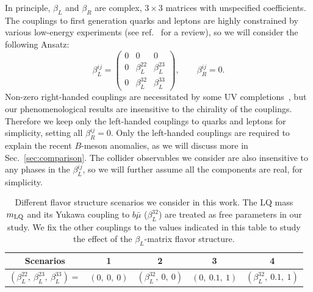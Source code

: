 \documentclass[a4paper,11pt]{article}
\begin{document}
In principle, $\beta_{L}$ and $\beta_R$ are complex, $3\times 3$ matrices with unspecified coefficients.
The couplings to first generation quarks and leptons are highly constrained by various low-energy experiments (see ref.~\cite{Dorsner:2016wpm} for a review), so we will consider the following Ansatz:
\begin{equation}
\label{eq:betas}
\beta_L^{ij} = \begin{pmatrix}
0 & 0 & 0 \\
0 & \beta_L^{22} & \beta_L^{23} \\
0 & \beta_L^{32} & \beta_L^{33}
\end{pmatrix},
\qquad
\beta_R^{ij} = 0.
\end{equation}
Non-zero right-handed couplings are necessitated by some UV completions~\cite{Pati:1973uk,Pati:1974yy}, but our phenomenological results are insensitive to the chirality of the couplings.
Therefore we keep only the left-handed couplings to quarks and leptons for simplicity, setting all $\beta_R^{ij} = 0$.
Only the left-handed couplings are required to explain the recent $B$-meson anomalies, as we will discuss more in Sec.~\ref{sec:comparison}.
The collider observables we consider are also insensitive to any phases in the $\beta_L^{ij}$, so we will further assume all the components are real, for simplicity.






\begin{table}[]
    \renewcommand{\arraystretch}{1.2}
    \centering
    \begin{tabular}{|c|c|c|c|c|}
    \hline
        Scenarios & 1 &  2 & 3 & 4\\
        \hline
        $\left(\beta_L^{22},~\beta_L^{23},~\beta_L^{33} \right)=$ & $\left(0,~0,~0\right)$ & $\left(\beta_L^{32},~0,~0\right)$ & $\left(0,~0.1,~1\right)$ & $\left(\beta_L^{32},~0.1,~1\right)$\\
        \hline
    \end{tabular}
    \caption{Different flavor structure scenarios we consider in this work. The LQ mass $m_{{\rm LQ}}$ and its Yukawa coupling to $b\bar{\mu}$ ($\beta_L^{32}$) are treated as free parameters in our study. We fix the other couplings to the values indicated in this table to study the effect of the $\beta_L$-matrix flavor structure.}
    \label{tab:flavor_structure}
\end{table}
\end{document}
